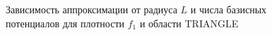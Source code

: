 \documentclass[a4paper, 12pt]{article}
\begin{document}
    \begin{figure}[h!]
      \noindent{}
      \caption{Зависимость аппроксимации от радиуса $L$ и числа базисных потенциалов для плотности $f_1$ и области TRIANGLE}
      \label{nolnol}
      \end{figure}  
\end{document}
